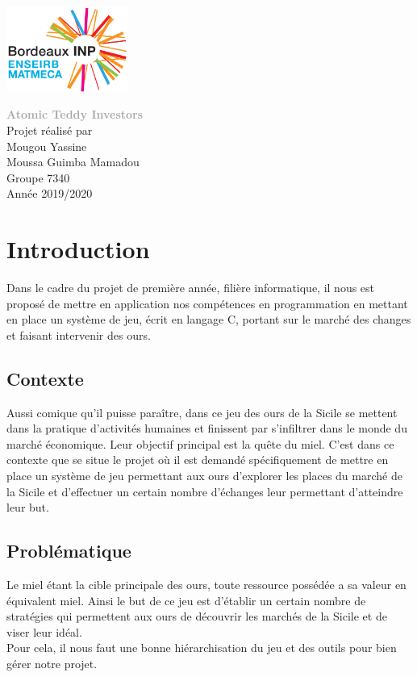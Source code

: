 \documentclass[a4paper,12pt]{article}
\begin{document}
\includegraphics[width=0.3\textwidth]{enseirb-matmeca.png}
\begin{center}
\vspace{2\baselineskip}
  \Huge
  \textcolor{darkgray}{\textbf{Atomic Teddy Investors}}\\
\vspace{4\baselineskip}
\large
Projet réalisé par \\
\Huge
\vspace{3\baselineskip}
Mougou Yassine\\
Moussa Guimba Mamadou\\
\vspace{3\baselineskip}
\large
Groupe 7340\\
\vspace{5\baselineskip}
Année 2019/2020
\end{center}
\large

\normalsize
\newpage 
\section{Introduction}

Dans le cadre du projet de première année, filière informatique, il nous est proposé de mettre en application nos compétences en programmation en mettant en place un système de jeu, écrit en langage C, portant sur le marché des changes et faisant intervenir des ours.

  \subsection{Contexte}
Aussi comique qu'il puisse paraître, dans ce jeu des ours de la Sicile se mettent dans la pratique d’activités humaines et finissent par s’infiltrer dans le monde du marché économique. Leur objectif principal est la quête du miel. C’est dans ce contexte que se situe le projet où il est demandé spécifiquement de mettre en place un système de jeu permettant aux ours d’explorer les places du marché de la Sicile et d’effectuer un certain nombre d’échanges leur permettant d’atteindre leur but.

  \subsection{Problématique}
Le miel étant la cible principale des ours, toute ressource possédée a sa valeur en équivalent miel. Ainsi le but de ce jeu est d'établir un certain nombre de stratégies qui permettent aux ours de découvrir les marchés de la Sicile et de viser leur idéal. \\
Pour cela, il nous faut une bonne hiérarchisation du jeu et des outils pour bien gérer notre projet.
\end{document}
